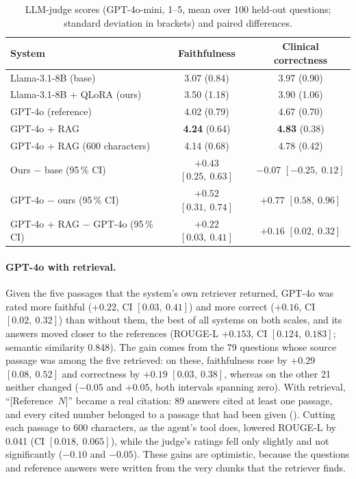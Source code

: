 \begin{table}[H]
\centering
\caption{LLM-judge scores (GPT-4o-mini, 1--5, mean over 100 held-out questions; standard deviation in brackets) and paired differences.}
\label{tab:judge}
\small
\begin{tabular}{lcc}
\toprule
\textbf{System} & \textbf{Faithfulness} & \textbf{Clinical correctness} \\
\midrule
Llama-3.1-8B (base) & 3.07 (0.84) & 3.97 (0.90) \\
Llama-3.1-8B + QLoRA (ours) & 3.50 (1.18) & 3.90 (1.06) \\
GPT-4o (reference) & 4.02 (0.79) & 4.67 (0.70) \\
GPT-4o + RAG & \textbf{4.24} (0.64) & \textbf{4.83} (0.38) \\
GPT-4o + RAG (600 characters) & 4.14 (0.68) & 4.78 (0.42) \\
\midrule
Ours $-$ base (95\,\% CI) & $+0.43$ $[0.25,\ 0.63]$ & $-0.07$ $[-0.25,\ 0.12]$ \\
GPT-4o $-$ ours (95\,\% CI) & $+0.52$ $[0.31,\ 0.74]$ & $+0.77$ $[0.58,\ 0.96]$ \\
GPT-4o + RAG $-$ GPT-4o (95\,\% CI) & $+0.22$ $[0.03,\ 0.41]$ & $+0.16$ $[0.02,\ 0.32]$ \\
\bottomrule
\end{tabular}
\end{table}

\paragraph{GPT-4o with retrieval.} Given the five passages that the system's own retriever returned, GPT-4o was rated more faithful ($+0.22$, CI $[0.03,\ 0.41]$) and more correct ($+0.16$, CI $[0.02,\ 0.32]$) than without them, the best of all systems on both scales, and its answers moved closer to the references (ROUGE-L $+0.153$, CI $[0.124,\ 0.183]$; semantic similarity 0.848). The gain comes from the 79 questions whose source passage was among the five retrieved: on these, faithfulness rose by $+0.29$ $[0.08,\ 0.52]$ and correctness by $+0.19$ $[0.03,\ 0.38]$, whereas on the other 21 neither changed ($-0.05$ and $+0.05$, both intervals spanning zero). With retrieval, ``[Reference~$N$]'' became a real citation: 89 answers cited at least one passage, and every cited number belonged to a passage that had been given (). Cutting each passage to 600 characters, as the agent's tool does, lowered ROUGE-L by 0.041 (CI $[0.018,\ 0.065]$), while the judge's ratings fell only slightly and not significantly ($-0.10$ and $-0.05$). These gains are optimistic, because the questions and reference answers were written from the very chunks that the retriever finds.

